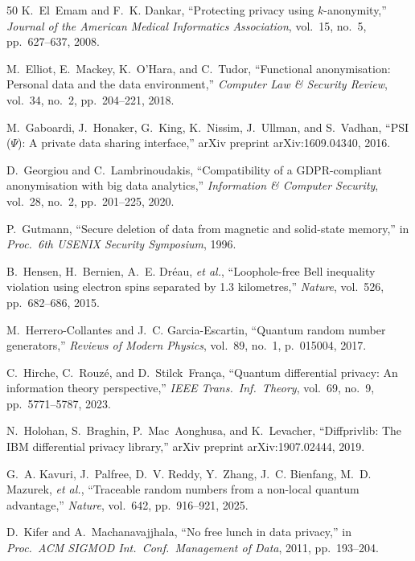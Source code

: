 \documentclass[journal]{IEEEtran}
\begin{document}
\begin{thebibliography}{50}
K.~El~Emam and F.~K. Dankar, ``Protecting privacy using $k$-anonymity,'' \emph{Journal of the American Medical Informatics Association}, vol.~15, no.~5, pp.~627--637, 2008.

M.~Elliot, E.~Mackey, K.~O'Hara, and C.~Tudor, ``Functional anonymisation: Personal data and the data environment,'' \emph{Computer Law \& Security Review}, vol.~34, no.~2, pp.~204--221, 2018.

M.~Gaboardi, J.~Honaker, G.~King, K.~Nissim, J.~Ullman, and S.~Vadhan, ``{PSI} ($\Psi$): A private data sharing interface,'' arXiv preprint arXiv:1609.04340, 2016.

D.~Georgiou and C.~Lambrinoudakis, ``Compatibility of a {GDPR}-compliant anonymisation with big data analytics,'' \emph{Information \& Computer Security}, vol.~28, no.~2, pp.~201--225, 2020.

P.~Gutmann, ``Secure deletion of data from magnetic and solid-state memory,'' in \emph{Proc.\ 6th USENIX Security Symposium}, 1996.

B.~Hensen, H.~Bernien, A.~E. Dr\'{e}au, \emph{et al.}, ``Loophole-free Bell inequality violation using electron spins separated by 1.3 kilometres,'' \emph{Nature}, vol.~526, pp.~682--686, 2015.

M.~Herrero-Collantes and J.~C. Garcia-Escartin, ``Quantum random number generators,'' \emph{Reviews of Modern Physics}, vol.~89, no.~1, p.~015004, 2017.

C.~Hirche, C.~Rouz\'{e}, and D.~Stilck~Fran\c{c}a, ``Quantum differential privacy: An information theory perspective,'' \emph{IEEE Trans.\ Inf.\ Theory}, vol.~69, no.~9, pp.~5771--5787, 2023.

N.~Holohan, S.~Braghin, P.~Mac~Aonghusa, and K.~Levacher, ``Diffprivlib: The {IBM} differential privacy library,'' arXiv preprint arXiv:1907.02444, 2019.

G.~A. Kavuri, J.~Palfree, D.~V. Reddy, Y.~Zhang, J.~C. Bienfang, M.~D. Mazurek, \emph{et al.}, ``Traceable random numbers from a non-local quantum advantage,'' \emph{Nature}, vol.~642, pp.~916--921, 2025.

D.~Kifer and A.~Machanavajjhala, ``No free lunch in data privacy,'' in \emph{Proc.\ ACM SIGMOD Int.\ Conf.\ Management of Data}, 2011, pp.~193--204.


\end{thebibliography}
\end{document}
